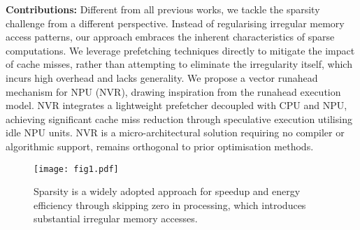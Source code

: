 \noindent \textbf{Contributions:} 
Different from all previous works, we tackle the sparsity challenge from a different perspective. 
Instead of regularising irregular memory access patterns, our approach embraces the inherent characteristics of sparse computations. We leverage prefetching techniques directly to mitigate the impact of cache misses, rather than attempting to eliminate the irregularity itself, which incurs high overhead and lacks generality. 
We propose a vector runahead mechanism for NPU (NVR), drawing inspiration from the runahead execution model\cite{8runahead, 8VR}.
NVR integrates a lightweight prefetcher decoupled with CPU and NPU, achieving significant cache miss reduction through speculative execution utilising idle NPU units.
NVR is a micro-architectural solution requiring no compiler or algorithmic support, remains orthogonal to prior optimisation methods. 

\begin{figure}[t]
\vspace{-20pt}
\hspace{-10pt}
\texttt{[image: fig1.pdf]}
\vspace{-17pt}
\caption{Sparsity is a widely adopted approach for speedup and energy efficiency through skipping zero in processing, which introduces substantial irregular memory accesses.}
\label{fig:fig1}
\vspace{-17pt}
\end{figure}

